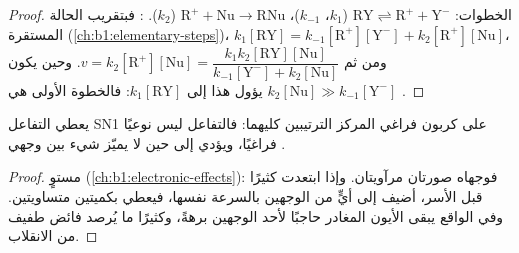 \begin{proof}
الخطوات: $\mathrm{RY} \rightleftharpoons \mathrm{R^+} + \mathrm{Y^-}$ ($k_1$،
$k_{-1}$)، $\mathrm{R^+} + \mathrm{Nu} \to \mathrm{RNu}$ ($k_2$).
 : فبتقريب الحالة
المستقرة (\cref{ch:b1:elementary-steps})، $k_1[\mathrm{RY}] =
k_{-1}[\mathrm{R^+}][\mathrm{Y^-}] + k_2[\mathrm{R^+}][\mathrm{Nu}]$، ومن ثم
$v = k_2[\mathrm{R^+}][\mathrm{Nu}] = \dfrac{k_1k_2[\mathrm{RY}][\mathrm{Nu}]}
{k_{-1}[\mathrm{Y^-}] + k_2[\mathrm{Nu}]}$. وحين يكون $k_2[\mathrm{Nu}] \gg
k_{-1}[\mathrm{Y^-}]$ يؤول هذا إلى $k_1[\mathrm{RY}]$: فالخطوة الأولى هي
.
\end{proof}

\begin{proposition}\label{prop:b1:nucleophilic-substitution:sn1-stereo}
يعطي التفاعل SN1 على كربون فراغي المركز الترتيبين كليهما: فالتفاعل
ليس نوعيًا فراغيًا، ويؤدي إلى  حين لا يميّز شيء
بين وجهي .
\end{proposition}

\begin{proof}
 مستوٍ (\cref{ch:b1:electronic-effects}): فوجهاه
صورتان مرآويتان. وإذا ابتعدت  كثيرًا قبل
الأسر، أضيف  إلى أيٍّ من الوجهين بالسرعة نفسها، فيعطي
 بكميتين متساويتين. وفي الواقع يبقى الأيون المغادر
حاجبًا لأحد الوجهين برهةً، وكثيرًا ما يُرصد فائض طفيف من الانقلاب.
\end{proof}

